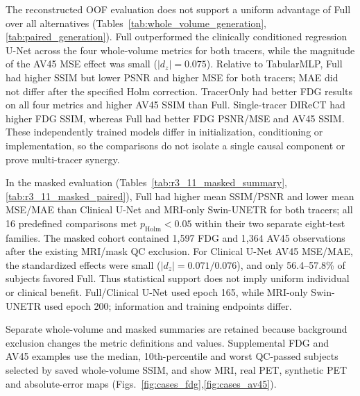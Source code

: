 The reconstructed OOF evaluation does not support a uniform advantage of Full over all alternatives (Tables~\ref{tab:whole_volume_generation},\ref{tab:paired_generation}). Full outperformed the clinically conditioned regression U-Net across the four whole-volume metrics for both tracers, while the magnitude of the AV45 MSE effect was small ($|d_z|=0.075$). Relative to TabularMLP, Full had higher SSIM but lower PSNR and higher MSE for both tracers; MAE did not differ after the specified Holm correction. TracerOnly had better FDG results on all four metrics and higher AV45 SSIM than Full. Single-tracer DIReCT had higher FDG SSIM, whereas Full had better FDG PSNR/MSE and AV45 SSIM. These independently trained models differ in initialization, conditioning or implementation, so the comparisons do not isolate a single causal component or prove multi-tracer synergy.

In the masked evaluation (Tables~\ref{tab:r3_11_masked_summary},\ref{tab:r3_11_masked_paired}), Full had higher mean SSIM/PSNR and lower mean MSE/MAE than Clinical U-Net and MRI-only Swin-UNETR for both tracers; all 16 predefined comparisons met $p_{\mathrm{Holm}}<0.05$ within their two separate eight-test families. The masked cohort contained 1,597 FDG and 1,364 AV45 observations after the existing MRI/mask QC exclusion. For Clinical U-Net AV45 MSE/MAE, the standardized effects were small ($|d_z|=0.071/0.076$), and only 56.4--57.8\% of subjects favored Full. Thus statistical support does not imply uniform individual or clinical benefit. Full/Clinical U-Net used epoch 165, while MRI-only Swin-UNETR used epoch 200; information and training endpoints differ.

Separate whole-volume and masked summaries are retained because background exclusion changes the metric definitions and values. Supplemental FDG and AV45 examples use the median, 10th-percentile and worst QC-passed subjects selected by saved whole-volume SSIM, and show MRI, real PET, synthetic PET and absolute-error maps (Figs.~\ref{fig:cases_fdg},\ref{fig:cases_av45}).
